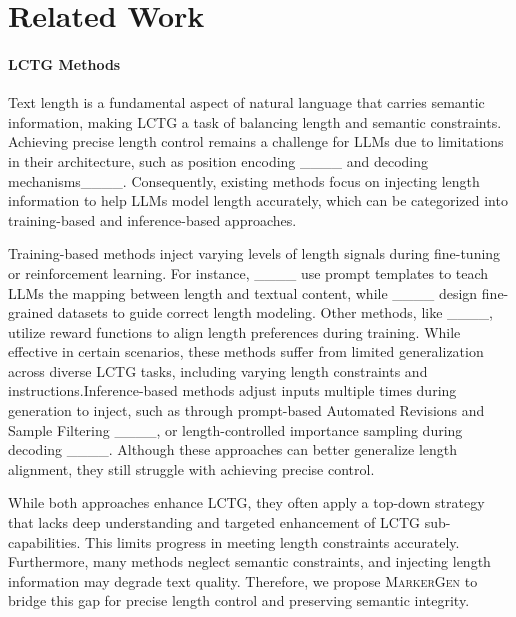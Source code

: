 \section{Related Work}
\label{sec:related work}


\paragraph{LCTG Methods}
Text length is a fundamental aspect of natural language that carries semantic information, making LCTG a task of balancing length and semantic constraints. Achieving precise length control remains a challenge for LLMs due to limitations in their architecture, such as position encoding ____ and decoding mechanisms____. Consequently, existing methods focus on injecting length information to help LLMs model length accurately, which can be categorized into training-based and inference-based approaches.

Training-based methods inject varying levels of length signals during fine-tuning or reinforcement learning. For instance, ____ use prompt templates to teach LLMs the mapping between length and textual content, while ____ design fine-grained datasets to guide correct length modeling. Other methods, like ____, utilize reward functions to align length preferences during training. While effective in certain scenarios, these methods suffer from limited generalization across diverse LCTG tasks, including varying length constraints and instructions.Inference-based methods adjust inputs multiple times during generation to inject, such as through prompt-based Automated Revisions and Sample Filtering ____, or length-controlled importance sampling during decoding ____. Although these approaches can better generalize length alignment, they still struggle with achieving precise control.

While both approaches enhance LCTG, they often apply a top-down strategy that lacks deep understanding and targeted enhancement of LCTG sub-capabilities. This limits progress in meeting length constraints accurately. Furthermore, many methods neglect semantic constraints, and injecting length information may degrade text quality. Therefore, we propose \textsc{MarkerGen} to bridge this gap for precise length control and preserving semantic integrity.